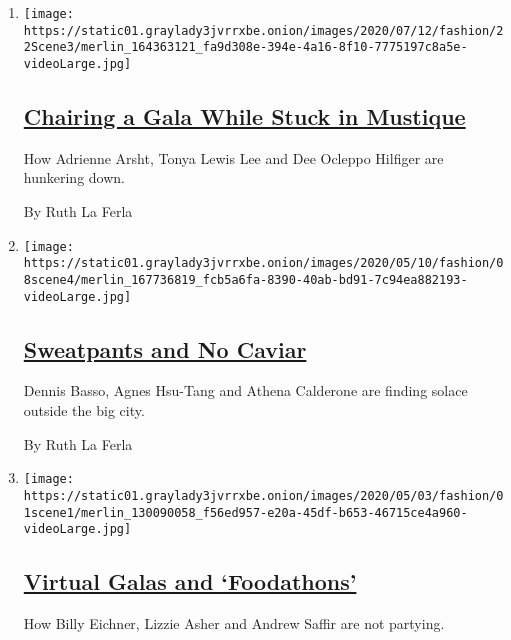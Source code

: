 \begin{enumerate}
\def\labelenumi{\arabic{enumi}.}
\item
  \texttt{[image: https://static01.graylady3jvrrxbe.onion/images/2020/07/12/fashion/22Scene3/merlin\_164363121\_fa9d308e-394e-4a16-8f10-7775197c8a5e-videoLarge.jpg]}

  \hypertarget{chairing-a-gala-while-stuck-in-mustique}{%
  \subsection{\texorpdfstring{\href{/2020/05/25/style/chairing-a-gala-while-stuck-in-mustique.html}{Chairing
  a Gala While Stuck in
  Mustique}}{Chairing a Gala While Stuck in Mustique}}\label{chairing-a-gala-while-stuck-in-mustique}}

  How Adrienne Arsht, Tonya Lewis Lee and Dee Ocleppo Hilfiger are
  hunkering down.

  By Ruth La Ferla
\item
  \texttt{[image: https://static01.graylady3jvrrxbe.onion/images/2020/05/10/fashion/08scene4/merlin\_167736819\_fcb5a6fa-8390-40ab-bd91-7c94ea882193-videoLarge.jpg]}

  \hypertarget{sweatpants-and-no-caviar}{%
  \subsection{\texorpdfstring{\href{/2020/05/08/style/sweatpants-and-no-caviar.html}{Sweatpants
  and No
  Caviar}}{Sweatpants and No Caviar}}\label{sweatpants-and-no-caviar}}

  Dennis Basso, Agnes Hsu-Tang and Athena Calderone are finding solace
  outside the big city.

  By Ruth La Ferla
\item
  \texttt{[image: https://static01.graylady3jvrrxbe.onion/images/2020/05/03/fashion/01scene1/merlin\_130090058\_f56ed957-e20a-45df-b653-46715ce4a960-videoLarge.jpg]}

  \hypertarget{virtual-galas-and-foodathons}{%
  \subsection{\texorpdfstring{\href{/2020/05/01/style/virtual-galas-and-foodathons.html}{Virtual
  Galas and
  `Foodathons'}}{Virtual Galas and `Foodathons'}}\label{virtual-galas-and-foodathons}}

  How Billy Eichner, Lizzie Asher and Andrew Saffir are not partying.


\end{enumerate}

